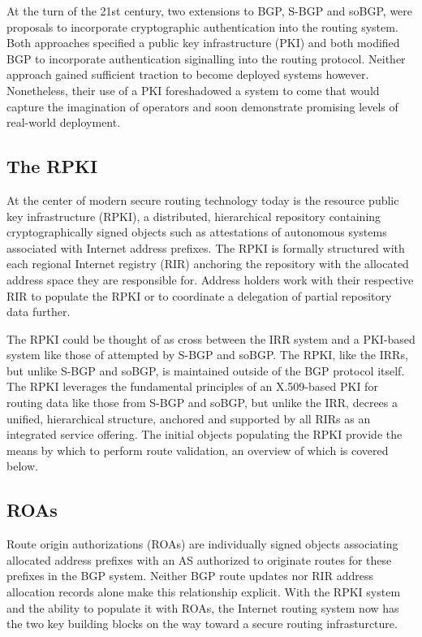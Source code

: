 \documentclass[sigconf]{acmart}
\begin{document}
At the turn of the 21st century, two extensions to BGP, S-BGP and soBGP,
were proposals to incorporate cryptographic authentication into the
routing system.\cite{kent_secure_2000}\cite{white_securing_2003}  Both
approaches specified a public key infrastructure (PKI) and both modified
BGP to incorporate authentication siginalling into the routing protocol.
Neither approach gained sufficient traction to become deployed systems
however.  Nonetheless, their use of a PKI foreshadowed a system to come
that would capture the imagination of operators and soon demonstrate
promising levels of real-world deployment.

\subsection{The RPKI}

At the center of modern secure routing technology today is the resource
public key infrastructure (RPKI), a distributed, hierarchical repository
containing cryptographically signed objects such as attestations of
autonomous systems associated with Internet address
prefixes.\cite{lepinski_infrastructure_2012}  The RPKI is formally
structured with each regional Internet registry (RIR) anchoring the
repository with the allocated address space they are responsible for.
Address holders work with their respective RIR to populate the RPKI or
to coordinate a delegation of partial repository data further.

The RPKI could be thought of as cross between the IRR system and a
PKI-based system like those of attempted by S-BGP and soBGP.  The RPKI,
like the IRRs, but unlike S-BGP and soBGP, is maintained outside of the
BGP protocol itself.  The RPKI leverages the fundamental principles of
an X.509-based PKI for routing data like those from S-BGP and soBGP, but
unlike the IRR, decrees a unified, hierarchical structure, anchored and
supported by all RIRs as an integrated service offering.  The initial
objects populating the RPKI provide the means by which to perform route
validation, an overview of which is covered below.

\subsection{ROAs}

Route origin authorizations (ROAs) are individually signed objects
associating allocated address prefixes with an AS authorized to
originate routes for these prefixes in the BGP system.  Neither BGP
route updates nor RIR address allocation records alone make this
relationship explicit.  With the RPKI system and the ability to populate
it with ROAs, the Internet routing system now has the two key building
blocks on the way toward a secure routing infrasturcture.
\end{document}
